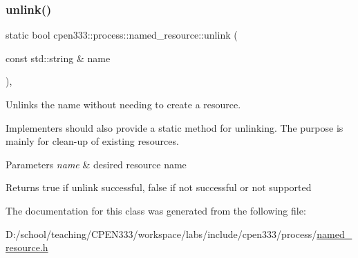 \mbox{\label{classcpen333_1_1process_1_1named__resource_a6cb427f033b51f08fcf2bc1e08bd6a32}} 
\subsubsection{\texorpdfstring{unlink()}{unlink()}\hspace{0.1cm}{\footnotesize\ttfamily [2/2]}}
{\footnotesize\ttfamily static bool cpen333\+::process\+::named\+\_\+resource\+::unlink (\begin{DoxyParamCaption}\item[{const std\+::string \&}]{name }\end{DoxyParamCaption})\hspace{0.3cm}{\ttfamily [inline]}, {\ttfamily [static]}}



Unlinks the name without needing to create a resource. 

Implementers should also provide a static method for unlinking. The purpose is mainly for clean-\/up of existing resources.


\begin{DoxyParams}{Parameters}
{\em name} & desired resource name \\
\hline
\end{DoxyParams}
\begin{DoxyReturn}{Returns}
{\ttfamily true} if unlink successful, {\ttfamily false} if not successful or not supported 
\end{DoxyReturn}


The documentation for this class was generated from the following file\+:\begin{DoxyCompactItemize}
\item 
D\+:/school/teaching/\+C\+P\+E\+N333/workspace/labs/include/cpen333/process/\hyperlink{named__resource_8h}{named\+\_\+resource.\+h}\end{DoxyCompactItemize}
